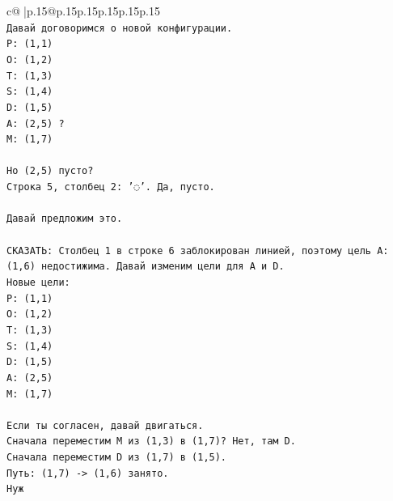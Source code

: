 \documentclass{article}
\begin{document}
{\begin{supertabular}{c@{$\;$}|p{.15\linewidth}@{}p{.15\linewidth}p{.15\linewidth}p{.15\linewidth}p{.15\linewidth}p{.15\linewidth}}
{{{\\ 
\texttt{Давай договоримся о новой конфигурации.} \\
\texttt{P: (1,1)} \\
\texttt{O: (1,2)} \\
\texttt{T: (1,3)} \\
\texttt{S: (1,4)} \\
\texttt{D: (1,5)} \\
\texttt{A: (2,5) ?} \\
\texttt{M: (1,7)} \\
\\ 
\texttt{Но (2,5) пусто?} \\
\texttt{Строка 5, столбец 2: '◌'. Да, пусто.} \\
\\ 
\texttt{Давай предложим это.} \\
\\ 
\texttt{СКАЗАТЬ: Столбец 1 в строке 6 заблокирован линией, поэтому цель A: (1,6) недостижима. Давай изменим цели для A и D.} \\
\texttt{Новые цели:} \\
\texttt{P: (1,1)} \\
\texttt{O: (1,2)} \\
\texttt{T: (1,3)} \\
\texttt{S: (1,4)} \\
\texttt{D: (1,5)} \\
\texttt{A: (2,5)} \\
\texttt{M: (1,7)} \\
\\ 
\texttt{Если ты согласен, давай двигаться.} \\
\texttt{Сначала переместим M из (1,3) в (1,7)? Нет, там D.} \\
\texttt{Сначала переместим D из (1,7) в (1,5).} \\
\texttt{Путь: (1,7) {-}> (1,6) занято.} \\
\texttt{Нуж} \\
            }
        }
    }
     \\ \\


\end{supertabular}}
\end{document}
